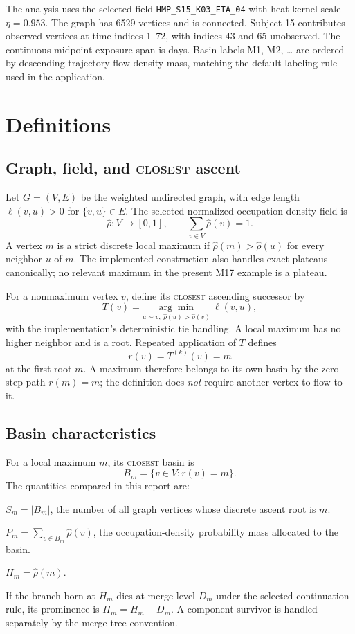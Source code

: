 \documentclass[11pt]{article}
\newcommand{\rhofield}{\widehat{\rho}}
\begin{document}
The analysis uses the selected field
\texttt{HMP\_S15\_K03\_ETA\_04} with heat-kernel scale
$\eta=0.953$.  The graph has \num{6529} vertices and is connected.  Subject 15
contributes \SubjectVisitCount{} observed vertices at time indices 1--72, with
indices 43 and 65 unobserved.  The continuous midpoint-exposure span is
\ObservedSpanDays{} days.  Basin labels M1, M2, \ldots{} are ordered by
descending trajectory-flow density mass, matching the default labeling rule
used in the application.

\section{Definitions}
\label{sec:definitions}

\subsection{Graph, field, and \textsc{closest} ascent}

Let $G=(V,E)$ be the weighted undirected graph, with edge length
$\ell(v,u)>0$ for $\{v,u\}\in E$.  The selected normalized occupation-density
field is
\[
  \rhofield:V\rightarrow[0,1],
  \qquad
  \sum_{v\in V}\rhofield(v)=1.
\]
A vertex $m$ is a strict discrete local maximum if
$\rhofield(m)>\rhofield(u)$ for every neighbor $u$ of $m$.  The implemented
construction also handles exact plateaus canonically; no relevant maximum in
the present M17 example is a plateau.

For a nonmaximum vertex $v$, define its \textsc{closest} ascending successor
by
\[
 T(v)=\underset{
   u\sim v,\ \rhofield(u)>\rhofield(v)
 }{\arg\min}\ \ell(v,u),
\]
with the implementation's deterministic tie handling.  A local maximum has no
higher neighbor and is a root.  Repeated application of $T$ defines
\[
 r(v)=T^{(k)}(v)=m
\]
at the first root $m$.  A maximum therefore belongs to its own basin by the
zero-step path $r(m)=m$; the definition does \emph{not} require another vertex
to flow to it.

\subsection{Basin characteristics}

For a local maximum $m$, its \textsc{closest} basin is
\[
 B_m=\{v\in V:r(v)=m\}.
\]
The quantities compared in this report are:
\begin{description}[style=nextline]
  \item[Graph support]
  $S_m=|B_m|$, the number of all graph vertices whose discrete ascent root is
  $m$.
  \item[Density mass]
  $P_m=\sum_{v\in B_m}\rhofield(v)$, the occupation-density probability mass
  allocated to the basin.
  \item[Peak value]
  $H_m=\rhofield(m)$.
  \item[Merge level and prominence]
  If the branch born at $H_m$ dies at merge level $D_m$ under the selected
  continuation rule, its prominence is $\Pi_m=H_m-D_m$.  A component survivor
  is handled separately by the merge-tree convention.
\end{description}
\end{document}
